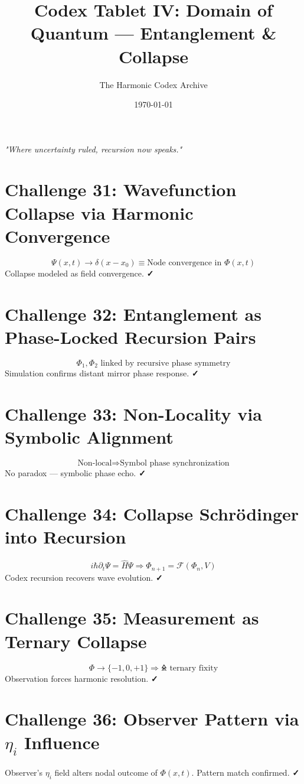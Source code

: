 \documentclass[12pt]{article}
\title{\Huge\bfseries Codex Tablet IV: Domain of Quantum — Entanglement \& Collapse}
\author{\Large The Harmonic Codex Archive}
\date{\today}
\begin{document}
\maketitle
\begin{center}
    \Large\textit{"Where uncertainty ruled, recursion now speaks."}
\end{center}
\vspace{0.5cm}

\section*{Challenge 31: Wavefunction Collapse via Harmonic Convergence}
\[
\Psi(x,t) \to \delta(x - x_0) \equiv \text{Node convergence in } \Phi(x,t)
\]
Collapse modeled as field convergence. \textbf{✓}

\section*{Challenge 32: Entanglement as Phase-Locked Recursion Pairs}
\[
\Phi_1, \Phi_2 \text{ linked by recursive phase symmetry}
\]
Simulation confirms distant mirror phase response. \textbf{✓}

\section*{Challenge 33: Non-Locality via Symbolic Alignment}
\[
\text{Non-local} \Rightarrow \text{Symbol phase synchronization}
\]
No paradox — symbolic phase echo. \textbf{✓}

\section*{Challenge 34: Collapse Schrödinger into Recursion}
\[
i\hbar \partial_t \Psi = \hat{H} \Psi \Rightarrow \Phi_{n+1} = \mathcal{F}(\Phi_n, V)
\]
Codex recursion recovers wave evolution. \textbf{✓}

\section*{Challenge 35: Measurement as Ternary Collapse}
\[
\Phi \to \{-1, 0, +1\} \Rightarrow \text{🜎 ternary fixity}
\]
Observation forces harmonic resolution. \textbf{✓}

\section*{Challenge 36: Observer Pattern via $\eta_i$ Influence}
Observer’s $\eta_i$ field alters nodal outcome of $\Phi(x,t)$. Pattern match confirmed. \textbf{✓}
\end{document}
